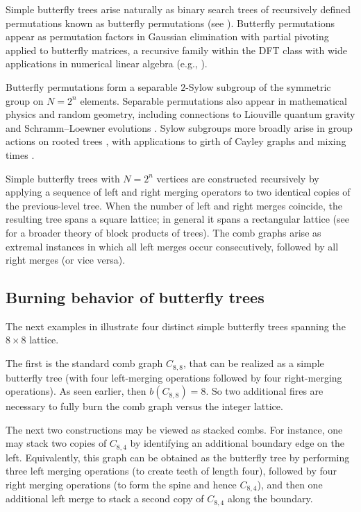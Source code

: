 \documentclass{article}
\begin{document}
Simple butterfly trees arise naturally as binary search trees of recursively defined permutations known as butterfly permutations (see \cite{P24,PZ24}). Butterfly permutations appear as permutation factors in Gaussian elimination with partial pivoting applied to butterfly matrices, a recursive family within the DFT class with wide applications in numerical linear algebra (e.g., \cite{Pa95,Tr19,PT23,lindquist2024generalizing}).

Butterfly permutations form a separable $2$-Sylow subgroup of the symmetric group on $N=2^n$ elements. Separable permutations also appear in mathematical physics and random geometry, including connections to Liouville quantum gravity and Schramm–Loewner evolutions \cite{borga2023baxter,BorgaGwynneSun2025}. Sylow subgroups more broadly arise in group actions on rooted trees \cite{Abert_Virag_2005}, with applications to girth of Cayley graphs \cite{Gamburd_Hoory_Shahshahani_Shalev_Virag_2009} and mixing times \cite{boyd2009fastest}.

Simple butterfly trees with $N=2^n$ vertices are constructed recursively by applying a sequence of left and right merging operators to two identical copies of the previous-level tree. When the number of left and right merges coincide, the resulting tree spans a square lattice; in general it spans a rectangular lattice (see \cite{PZ25} for a broader theory of block products of trees). The comb graphs arise as extremal instances in which all left merges occur consecutively, followed by all right merges (or vice versa).

\subsection{Burning behavior of butterfly trees}

The next examples in  illustrate four distinct simple butterfly trees spanning the $8 \times 8$ lattice.

The first is the standard comb graph $C_{8,8}$, that can be realized as a simple butterfly tree (with four left-merging operations followed by four right-merging operations). As seen earlier, then $b(C_{8,8}) = 8$. So two additional fires are necessary to fully burn the comb graph versus the integer lattice.

The next two constructions may be viewed as stacked combs. For instance, one may stack two copies of $C_{8,4}$ by identifying an additional boundary edge on the left. Equivalently, this graph can be obtained as the butterfly tree by performing three left merging operations (to create teeth of length four), followed by four right merging operations (to form the spine and hence $C_{8,4}$), and then one additional left merge to stack a second copy of $C_{8,4}$ along the boundary.
\end{document}
